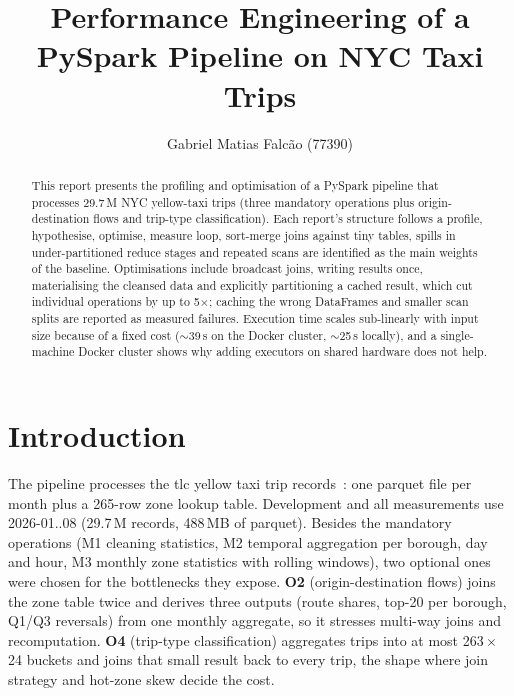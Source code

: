 \documentclass[sigconf]{acmart}
\begin{document}
\title{Performance Engineering of a PySpark Pipeline on NYC Taxi Trips}

\author{Gabriel Matias Falcão (77390)}

\begin{abstract}
      This report presents the profiling and optimisation of a PySpark pipeline that
      processes 29.7\,M NYC yellow-taxi trips (three mandatory operations plus
      origin-destination flows and trip-type classification). Each report's structure
      follows a profile, hypothesise, optimise, measure loop, sort-merge joins
      against tiny tables, spills in under-partitioned reduce stages and repeated
      scans are identified as the main weights of the baseline. Optimisations include
      broadcast joins, writing results once, materialising the cleansed data and
      explicitly partitioning a cached result, which cut individual operations by up
      to 5$\times$; caching the wrong DataFrames and smaller scan splits are reported
      as measured failures. Execution time scales sub-linearly with input size
      because of a fixed cost ($\sim$39\,s on the Docker cluster, $\sim$25\,s
      locally), and a single-machine Docker cluster shows why adding executors on
      shared hardware does not help.
\end{abstract}


\maketitle

\section{Introduction}

The pipeline processes the \gls{tlc} yellow taxi trip records~\cite{tlc}: one
parquet file per month plus a 265-row zone lookup table. Development and all
measurements use 2026-01..08 (29.7\,M records, 488\,MB of parquet). Besides the
mandatory operations (M1 cleaning statistics, M2 temporal aggregation per
borough, day and hour, M3 monthly zone statistics with rolling windows), two
optional ones were chosen for the bottlenecks they expose. \textbf{O2}
(origin-destination flows) joins the zone table twice and derives three outputs
(route shares, top-20 per borough, Q1/Q3 reversals) from one monthly aggregate,
so it stresses multi-way joins and recomputation. \textbf{O4} (trip-type
classification) aggregates trips into at most 263\,$\times$\,24 buckets and
joins that small result back to every trip, the shape where join strategy and
hot-zone skew decide the cost.
\end{document}
